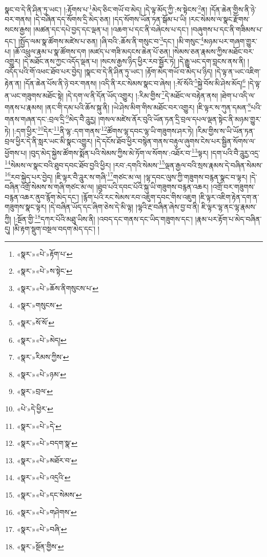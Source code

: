 སྣང་བ་དེ་ནི་ཤིན་ཏུ་ཡང་། །:རྟོགས་པ་\footnote{«སྣར་»«པེ་»རྟོག་པ་}མེད་ཅིང་གཡོ་བ་མེད། །དེ་ལྟ་མོད་ཀྱི་:ས་སྟེངས་\footnote{«སྣར་»«པེ་»ས་སྟེང་}ན། །དོན་ཆེན་གྱིས་ནི་ཉེ་བར་གནས། །དེ་བཞིན་དད་སོགས་དྲི་མེད་ཅན། །དད་སོགས་ཡོན་ཏན་སྒོམ་པ་ཡི། །རང་སེམས་ལ་སྣང་རྫོགས་སངས་རྒྱས། །མཚན་དང་དཔེ་བྱད་དང་ལྡན་པ། །འཆག་པ་དང་ནི་བཞེངས་པ་དང་། །བཞུགས་པ་དང་ནི་གཟིམས་པ་དང་། །སྤྱོད་ལམ་སྣ་ཚོགས་མཛེས་པ་ཅན། །ཞི་བའི་:ཆོས་ནི་གསུང་བ་\footnote{«སྣར་»«པེ་»ཆོས་ནིགསུངས་པ་}དང་། །མི་གསུང་\footnote{«སྣར་»གསུངས་}མཉམ་པར་གཞག་གྱུར་པ། །ཆོ་འཕྲུལ་རྣམ་པ་སྣ་ཚོགས་དག །མཛད་པ་གཟི་མདངས་ཆེན་པོ་ཅན། །སེམས་ཅན་རྣམས་ཀྱིས་མཐོང་བར་འགྱུར། །དེ་མཐོང་ནས་ཀྱང་འདོད་ལྡན་པ། །སངས་རྒྱས་ཉིད་ཕྱིར་རབ་སྦྱོར་ཏེ། །དེ་རྒྱུ་ཡང་དག་བླངས་ནས་ནི། །འདོད་པའི་གོ་འཕང་ཐོབ་པར་བྱེད། །སྣང་བ་དེ་ནི་ཤིན་ཏུ་ཡང་། །རྟོག་མེད་གཡོ་བ་མེད་པ་ཉིད། །དེ་ལྟ་ན་ཡང་འཇིག་རྟེན་ན། །དོན་ཆེན་པོས་ནི་ཉེ་བར་གནས། །འདི་ནི་རང་སེམས་སྣང་བ་ཞེས། །:སོ་སོའི་\footnote{«སྣར་»སོ་སོ་}སྐྱེ་བོས་མི་ཤེས་མོད།\footnote{«སྣར་»«པེ་»མེད།} །དེ་ལྟ་ན་ཡང་གཟུགས་མཐོང་སྟེ། །དེ་དག་ལ་ནི་དོན་ཡོད་འགྱུར། །:རིམ་གྱིས་\footnote{«སྣར་»རིམས་ཀྱིས་}དེ་མཐོང་ལ་བརྟེན་ནས། །ཐེག་པ་འདི་ལ་གནས་པ་རྣམས། །ནང་གི་དམ་པའི་ཆོས་སྐུ་ནི། །ཡེ་ཤེས་མིག་གིས་མཐོང་བར་འགྱུར། །ཇི་ལྟར་ས་ཀུན་དམན་\footnote{«སྣར་»«པེ་»ཉམ་}པའི་གནས་གཞན་དང་:བྲལ་དྲི་\footnote{«སྣར་»བྲལ་}མེད་བཻ་ཌཱུརྱ། །གསལ་མཛེས་ནོར་བུའི་ཡོན་ཏན་དྲི་བྲལ་དཔལ་ལྡན་སྟེང་ནི་མཉམ་གྱུར་ཏེ། །:དག་ཕྱིར་\footnote{«པེ་»དེ་ཕྱིར་}དེར་\footnote{«སྣར་»«པེ་»དེ་}ནི་ལྷ་:དག་གནས་\footnote{«སྣར་»«པེ་»བདག་སྣ་}ཚོགས་ལྷ་དབང་ལྷ་ཡི་གཟུགས་ཤར་ཏེ། །རིམ་གྱིས་ས་ཡི་ཡོན་ཏན་བྲལ་ཕྱིར་དེ་ནི་སླར་ཡང་མི་སྣང་འགྱུར། །དེ་དངོས་ཐོབ་ཕྱིར་བསྙེན་གནས་བརྟུལ་ཞུགས་ངེས་པར་སྦྱིན་སོགས་ལ་ཕྱོགས་པ། །བུད་མེད་སྐྱེས་ཚོགས་སྨོན་པའི་སེམས་ཀྱིས་མེ་ཏོག་ལ་སོགས་:འཐོར་བ་\footnote{«སྣར་»«པེ་»མཐོར་བ་}ལྟར། །དག་པའི་བཻ་ཌཱུརྱ་འདྲ་\footnote{«སྣར་»«པེ་»འདྲའི་}སེམས་ལ་སྣང་བའི་ཐུབ་དབང་ཐོབ་བྱའི་ཕྱིར། །རབ་:དགའི་སེམས་\footnote{«སྣར་»«པེ་»དང་སེམས་}ལྡན་རྒྱལ་བའི་སྲས་རྣམས་དེ་བཞིན་སེམས་\footnote{«སྣར་»«པེ་»གཤེགས་}རབ་སྐྱེད་པར་བྱེད། །ཇི་ལྟར་བཻ་ཌཱུར་ས་གཞི་\footnote{«སྣར་»«པེ་»བཞི་}གཙང་མ་ལ། །ལྷ་དབང་ལུས་ཀྱི་གཟུགས་བརྙན་སྣང་བ་ལྟར། །དེ་བཞིན་འགྲོ་སེམས་ས་གཞི་གཙང་མ་ལ། །ཐུབ་པའི་དབང་པོའི་སྐུ་ཡི་གཟུགས་བརྙན་འཆར། །འགྲོ་བར་གཟུགས་བརྙན་འཆར་ནུབ་རྙོག་མེད་དང་། །རྙོག་པའི་རང་སེམས་རབ་འཇུག་དབང་གིས་འཇུག །ཇི་ལྟར་འཇིག་རྟེན་དག་ན་གཟུགས་སྣང་ལྟར། །དེ་བཞིན་ཡོད་དང་ཞིག་ཅེས་དེ་མི་ལྟ། །ལྷའི་རྔ་བཞིན་ཞེས་བྱ་བ་ནི། ཇི་ལྟར་ལྷ་ནང་ལྷ་རྣམས་ཀྱི། །:སྔོན་གྱི་\footnote{«སྣར་»སྔོན་གྱིས་}དཀར་པོའི་མཐུ་ཡིས་ནི། །འབད་དང་གནས་དང་ཡིད་གཟུགས་དང་། །རྣམ་པར་རྟོག་པ་མེད་བཞིན་དུ། །མི་རྟག་སྡུག་བསྔལ་བདག་མེད་དང་། །
